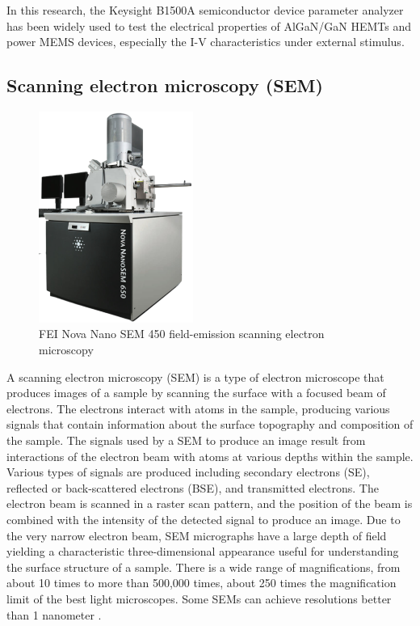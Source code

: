 In this research, the Keysight B1500A semiconductor device parameter analyzer has been widely used to test the electrical properties of AlGaN/GaN HEMTs and power MEMS devices, especially the I-V characteristics under external stimulus.
 

\subsection{Scanning electron microscopy (SEM)}

\begin{figure}[H] 
\centering    
\includegraphics[width=0.45\textwidth]{sem}
\caption[FEI Nova Nano SEM 450 field-emission scanning electron microscopy]{FEI Nova Nano SEM 450 field-emission scanning electron microscopy}
\label{fig:sem}
\end{figure}

A scanning electron microscopy (SEM)  is a type of electron microscope that produces images of a sample by scanning the surface with a focused beam of electrons. The electrons interact with atoms in the sample, producing various signals that contain information about the surface topography and composition of the sample. The signals used by a SEM to produce an image result from interactions of the electron beam with atoms at various depths within the sample. Various types of signals are produced including secondary  electrons (SE), reflected or back-scattered electrons  (BSE), and transmitted  electrons. The electron beam is scanned in a raster scan pattern, and the position of the beam is combined with the intensity of the detected signal to produce an image. Due to the very narrow electron beam, SEM micrographs have a large depth of field yielding a characteristic three-dimensional appearance useful for understanding the surface structure of a sample. There is a wide range of magnifications, from about 10 times to more than 500,000 times, about 250 times the magnification limit of the best light microscopes. Some SEMs can achieve resolutions better than 1 nanometer \cite{reimer2000scanning}.

